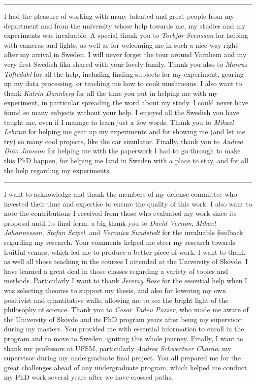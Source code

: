 \vspace{7pt}\hrule\vspace{5pt}

I had the pleasure of working with many talented and great people from my department and from the university whose help towards me, my studies and my experiments was invaluable. A special thank you to \textit{Torbjor Svensson} for helping with cameras and lights, as well as for welcoming me in such a nice way right after my arrival in Sweden. I will never forget the tour around Varnhem and my very first Swedish fika shared with your lovely family. Thank you also to \textit{Marcus Toftedahl} for all the help, including finding subjects for my experiment, gearing up my data processing, or teaching me how to cook mushrooms. I also want to thank \textit{Katrin Dannberg} for all the time you put in helping me with my experiment, in particular spreading the word about my study. I could never have found so many subjects without your help. I enjoyed all the Swedish you have taught me, even if I manage to learn just a few words. Thank you to \textit{Mikael Lebram} for helping me gear up my experiments and for showing me (and let me try) so many cool projects, like the car simulator. Finally, thank you to \textit{Andrea Di{\~a}o Jonsson} for helping me with the paperwork I had to go through to make this PhD happen, for helping me land in Sweden with a place to stay, and for all the help regarding my experiments.

\vspace{7pt}\hrule\vspace{5pt}

I want to acknowledge and thank the members of my defense committee who invested their time and expertise to ensure the quality of this work. I also want to note the contributions I received from those who evaluated my work since its proposal until its final form: a big thank you to \textit{David Vernon}, \textit{Mikael Johannesson}, \textit{Stefan Seipel}, and \textit{Veronica Sundstedt} for the invaluable feedback regarding my research. Your comments helped me steer my research towards fruitful venues, which led me to produce a better piece of work. I want to thank as well all those teaching in the courses I attended at the University of Sk{\"o}vde. I have learned a great deal in those classes regarding a variety of topics and methods. Particularly I want to thank \textit{Jeremy Rose} for the essential help when I was selecting theories to support my thesis, and also for lowering my own positivist and quantitative walls, allowing me to see the bright light of the philosophy of science. Thank you to \textit{Cesar Tadeu Pozzer}, who made me aware of the University of Sk{\"o}vde and its PhD program years after being my supervisor during my masters. You provided me with essential information to enroll in the program and to move to Sweden, igniting this whole journey. Finally, I want to thank my professors at UFSM, particularly \textit{Andrea Schwertner Char{\~a}o}, my supervisor during my undergraduate final project. You all prepared me for the great challenges ahead of any undergraduate program, which helped me conduct my PhD work several years after we have crossed paths.

